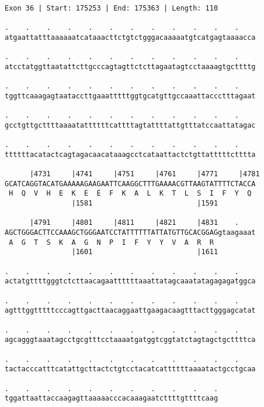 \documentclass{article}
\begin{document}
\newpage
\begin{Verbatim}
Exon 36 | Start: 175253 | End: 175363 | Length: 110
 
.    .    .    .    .    .    .    .    .    .    .    .    
atgaattatttaaaaaatcataaacttctgtctgggacaaaaatgtcatgagtaaaacca
  
.    .    .    .    .    .    .    .    .    .    .    .    
atcctatggttaatattcttgcccagtagttctcttagaatagtcctaaaagtgcttttg
  
.    .    .    .    .    .    .    .    .    .    .    .    
tggttcaaagagtaataccttgaaatttttggtgcatgttgccaaattaccctttagaat
  
.    .    .    .    .    .    .    .    .    .    .    .    
gcctgttgcttttaaaatattttttcattttagtattttattgtttatccaattatagac
  
.    .    .    .    .    .    .    .    .    .    .    .    
ttttttacatactcagtagacaacataaagcctcataattactctgttatttttctttta
  
      |4731     |4741     |4751     |4761     |4771     |4781
GCATCAGGTACATGAAAAAGAAGAATTCAAGGCTTTGAAAACGTTAAGTATTTTCTACCA
 H  Q  V  H  E  K  E  E  F  K  A  L  K  T  L  S  I  F  Y  Q 
                |1581                         |1591         
  
      |4791     |4801     |4811     |4821     |4831    .    
AGCTGGGACTTCCAAAGCTGGGAATCCTATTTTTTATTATGTTGCACGGAGgtaagaaat
 A  G  T  S  K  A  G  N  P  I  F  Y  Y  V  A  R  R          
                |1601                         |1611         
  
.    .    .    .    .    .    .    .    .    .    .    .    
actatgttttgggtctcttaacagaattttttaaattatagcaaatatagagagatggca
  
.    .    .    .    .    .    .    .    .    .    .    .    
agtttggtttttcccagttgacttaacaggaattgaagacaagtttacttgggagcatat
  
.    .    .    .    .    .    .    .    .    .    .    .    
agcagggtaaatagcctgcgtttcctaaaatgatggtcggtatctagtagctgcttttca
  
.    .    .    .    .    .    .    .    .    .    .    .    
tactacccatttcatattgcttactctgtcctacatcattttttaaaatactgcctgcaa
  
.    .    .    .    .    .    .    .    .    .    .
tggattaattaccaagagttaaaaacccacaaagaatcttttgttttcaag
\end{Verbatim}
\newpage
\end{document}

